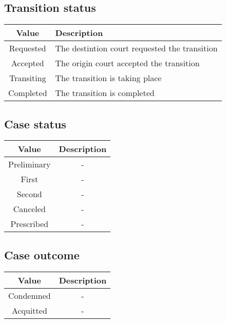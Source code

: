 \documentclass{article}
\begin{document}
\subsection{Transition status}
\begin{table}[h]
    \begin{center}
        \begin{tabular}{c|l}
            \toprule
            \textbf{Value} &
            \textbf{Description}                                           \\
            \midrule
            Requested      & The destintion court requested the transition \\
            Accepted       & The origin court accepted the transition      \\
            Transiting     & The transition is taking place                \\
            Completed      & The transition is completed                   \\
            \bottomrule
        \end{tabular}
    \end{center}
\end{table}

\subsection{Case status}
\begin{table}[h]
    \begin{center}
        \begin{tabular}{c|c}
            \toprule
            \textbf{Value} &
            \textbf{Description} \\
            \midrule
            Preliminary    & -   \\
            First          & -   \\
            Second         & -   \\
            Canceled       & -   \\
            Prescribed     & -   \\
            \bottomrule
        \end{tabular}
    \end{center}
\end{table}

\subsection{Case outcome}
\begin{table}[h]
    \begin{center}
        \begin{tabular}{c|c}
            \toprule
            \textbf{Value} &
            \textbf{Description} \\
            \midrule
            Condemned      & -   \\
            Acquitted      & -   \\
            \bottomrule
        \end{tabular}
    \end{center}
\end{table}
\end{document}
